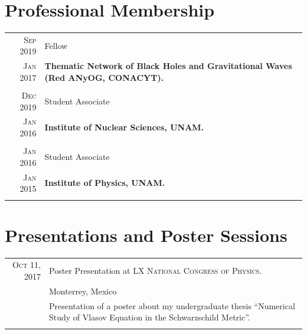 \documentclass[a4paper,10pt]{article} %
\begin{document}

\section{Professional Membership}
\bigskip
\begin{tabular}{r|l}
	\textsc{Sep 2019}& Fellow\\
	\textsc{Jan 2017}&\footnotesize{\textbf{Thematic Network of Black Holes and Gravitational Waves (Red ANyOG, CONACYT).}}\\
	\multicolumn{2}{c}{} \\
	\textsc{Dec 2019}& Student Associate\\
	\textsc{Jan 2016}&\footnotesize{\textbf{Institute of Nuclear Sciences, UNAM.}}\\
	\multicolumn{2}{c}{} \\
	\textsc{Jan 2016} & Student Associate\\
	\textsc{Jan 2015}&\footnotesize{\textbf{Institute of Physics, UNAM.}}\\
	\multicolumn{2}{c}{} \\
\end{tabular}


\section{Presentations and Poster Sessions}
\bigskip
\begin{tabular}{r|p{11cm}}
	
	\textsc{Oct 11, 2017} & Poster Presentation at \textsc{LX National Congress of Physics.}\\
	&\small Monterrey, Mexico\\
	&\footnotesize{Presentation of a poster about my undergraduate thesis ``Numerical Study of Vlasov Equation in the Schwarzschild Metric''.}\\
	\multicolumn{2}{c}{} \\
	
\end{tabular}
\end{document}
